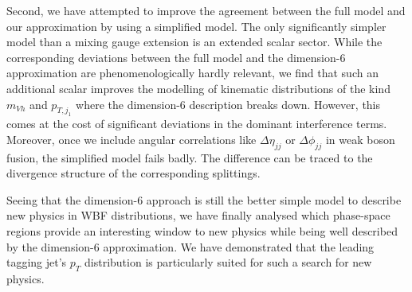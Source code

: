 Second, we have attempted to improve the agreement between the full
model and our approximation by using a simplified model. The only
significantly simpler model than a mixing gauge extension is an
extended scalar sector. While the corresponding deviations between the
full model and the dimension-6 approximation are phenomenologically
hardly relevant, we find that such an additional scalar improves the
modelling of kinematic distributions of the kind $m_{Vh}$ and
$p_{T,j_1}$ where the dimension-6 description breaks down. However,
this comes at the cost of significant deviations in the dominant
interference terms. Moreover, once we include angular correlations
like $\Delta \eta_{jj}$ or $\Delta \phi_{jj}$ in weak boson fusion,
the simplified model fails badly. The difference can be traced to the
divergence structure of the corresponding splittings.

Seeing that the dimension-6 approach is still the better simple model
to describe new physics in WBF distributions, we have finally analysed
which phase-space regions provide an interesting window to new physics
while being well described by the dimension-6 approximation.  We have
demonstrated that the leading tagging jet's $p_T$ distribution is
particularly suited for such a search for new physics.
